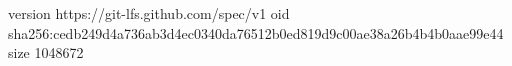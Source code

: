 version https://git-lfs.github.com/spec/v1
oid sha256:cedb249d4a736ab3d4ec0340da76512b0ed819d9c00ae38a26b4b4b0aae99e44
size 1048672

